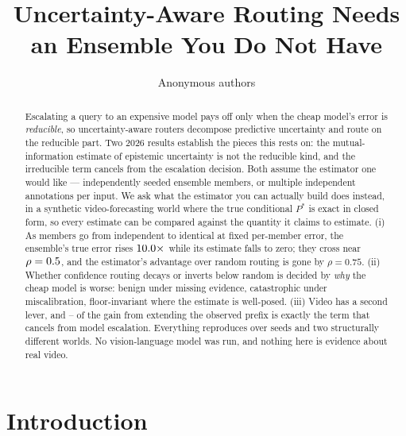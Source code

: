 \documentclass[10pt]{article}
\title{Uncertainty-Aware Routing Needs an Ensemble You Do Not Have}
\author{\name Anonymous authors}
\newcommand{\Pstar}{P^{*}}
\begin{document}
\maketitle

\begin{abstract}
Escalating a query to an expensive model pays off only when the cheap model's error is
\emph{reducible}, so uncertainty-aware routers decompose predictive uncertainty and route on the
reducible part. Two 2026 results establish the pieces this rests on: the mutual-information
estimate of epistemic uncertainty is not the reducible kind, and the irreducible term cancels from
the escalation decision. Both assume the estimator one would like --- independently seeded
ensemble members, or multiple independent annotations per input. We ask what the estimator you can
actually build does instead, in a synthetic video-forecasting world where the true conditional
$\Pstar$ is exact in closed form, so every estimate can be compared against the quantity it claims
to estimate. (i) As members go from independent to identical at fixed per-member error, the
ensemble's true error rises $10.0\times$ while its estimate falls to zero; they cross near
$\rho=0.5$, and the estimator's advantage over random routing is gone by $\rho=0.75$.
(ii) Whether confidence routing decays or inverts below random is decided by \emph{why} the cheap
model is worse: benign under missing evidence, catastrophic under miscalibration, floor-invariant
where the estimate is well-posed. (iii) Video has a second lever, and
\RobPreShareLo--\RobPreShareHi{} of the gain from extending the observed prefix is exactly the term
that cancels from model escalation. Everything reproduces over \RobSeeds{} seeds and two
structurally different worlds. No vision-language model was run, and nothing here is evidence
about real video.
\end{abstract}

\section{Introduction}
\end{document}
